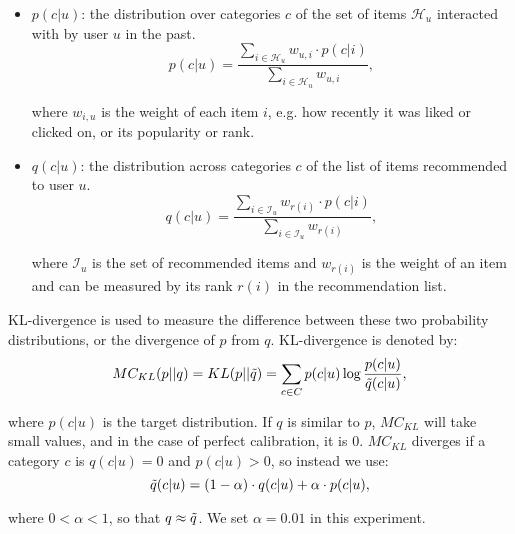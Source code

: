         \begin{itemize}
            \item $p(c|u)$: the distribution over categories $c$ of the set of items $\mathcal{H}_u$ interacted with by user $u$ in the past.
            \begin{equation}\label{input_preference}
                p(c|u) = \frac{\sum_{i \in \mathcal{H}_u} w_{u, i} \cdot p(c|i)}{\sum_{i \in \mathcal{H}_u} w_{u, i}},
            \end{equation}
        
            where $w_{i,u}$ is the weight of each item $i$, e.g. how recently it was liked or clicked on, or its popularity or rank.
            
            \item $q(c|u)$: the distribution across categories $c$ of the list of items recommended to user $u$.
            \begin{equation}
                q(c|u) = \frac{\sum_{i \in \mathcal{I}_u} w_{r(i)} \cdot p(c|i)}{\sum_{i \in \mathcal{I}_u} w_{r(i)}},
            \end{equation}
            
            where $\mathcal{I}_u$ is the set of recommended items and $w_{r(i)}$ is the weight of an item and can be measured by its rank $r(i)$ in the recommendation list.
        \end{itemize}
    
        KL-divergence \cite{kullback1997information} is used to measure the difference between these two probability distributions, or the divergence of $p$ from $q$. KL-divergence is denoted by:
        \begin{equation} \label{kl}
        MC_{KL}(p||q) = KL(p||\Tilde{q})= \sum_{c \in C}{p(c|u)\log\frac{p(c|u)}{\Tilde{q}(c|u)}},
        \end{equation}
        
        where $p(c|u)$ is the target distribution. If $q$ is similar to $p$, $MC_{KL}$ will take small values, and in the case of perfect calibration, it is 0. $MC_{KL}$ diverges if a category $c$ is $q(c|u)=0$ and $p(c|u)>0$, so instead we use:
        \begin{equation}
            \Tilde{q}(c|u) = (1 - \alpha) \cdot q(c|u) + \alpha \cdot p(c|u),
        \end{equation}
        
        where $0 < \alpha < 1$, so that $q \approx \Tilde{q}$. We set $\alpha = 0.01$ in this experiment.
        
